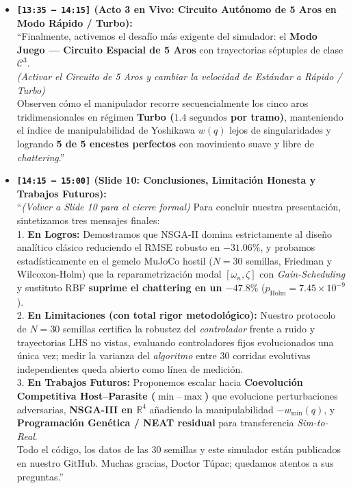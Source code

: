 \documentclass[11pt,a4paper]{article}
\begin{document}
\begin{itemize}
    \item \textbf{\texttt{[13:35 -- 14:15]} (Acto 3 en Vivo: Circuito Autónomo de 5 Aros en Modo Rápido / Turbo):} \\
    ``Finalmente, activemos el desafío más exigente del simulador: el \textbf{Modo Juego — Circuito Espacial de 5 Aros} con trayectorias séptuples de clase $\mathcal{C}^3$. \\
    \textit{(Activar el Circuito de 5 Aros y cambiar la velocidad de Estándar a Rápido / Turbo)} \\
    Observen cómo el manipulador recorre secuencialmente los cinco aros tridimensionales en régimen \textbf{Turbo ($1.4\text{ segundos}$ por tramo)}, manteniendo el índice de manipulabilidad de Yoshikawa $w(q)$ lejos de singularidades y logrando \textbf{5 de 5 encestes perfectos} con movimiento suave y libre de \textit{chattering}.''

    \item \textbf{\texttt{[14:15 -- 15:00]} (Slide 10: Conclusiones, Limitación Honesta y Trabajos Futuros):} \\
    ``\textit{(Volver a Slide 10 para el cierre formal)} Para concluir nuestra presentación, sintetizamos tres mensajes finales: \\
    1. \textbf{En Logros:} Demostramos que NSGA-II domina estrictamente al diseño analítico clásico reduciendo el RMSE robusto en \textbf{$-31.06\%$}, y probamos estadísticamente en el gemelo MuJoCo hostil ($N=30$ semillas, Friedman y Wilcoxon-Holm) que la reparametrización modal $[\omega_n, \zeta]$ con \textit{Gain-Scheduling} y sustituto RBF \textbf{suprime el chattering en un $-47.8\%$} ($p_{\text{Holm}} = 7.45 \times 10^{-9}$). \\
    2. \textbf{En Limitaciones (con total rigor metodológico):} Nuestro protocolo de $N=30$ semillas certifica la robustez del \textit{controlador} frente a ruido y trayectorias LHS no vistas, evaluando controladores fijos evolucionados una única vez; medir la varianza del \textit{algoritmo} entre 30 corridas evolutivas independientes queda abierto como línea de medición. \\
    3. \textbf{En Trabajos Futuros:} Proponemos escalar hacia \textbf{Coevolución Competitiva Host--Parasite ($\min\text{--}\max$)} que evolucione perturbaciones adversarias, \textbf{NSGA-III en $\mathbb{R}^4$} añadiendo la manipulabilidad $-w_{\min}(q)$, y \textbf{Programación Genética / NEAT residual} para transferencia \textit{Sim-to-Real}. \\
    Todo el código, los datos de las 30 semillas y este simulador están publicados en nuestro GitHub. Muchas gracias, Doctor Túpac; quedamos atentos a sus preguntas.''
\end{itemize}
\end{document}
